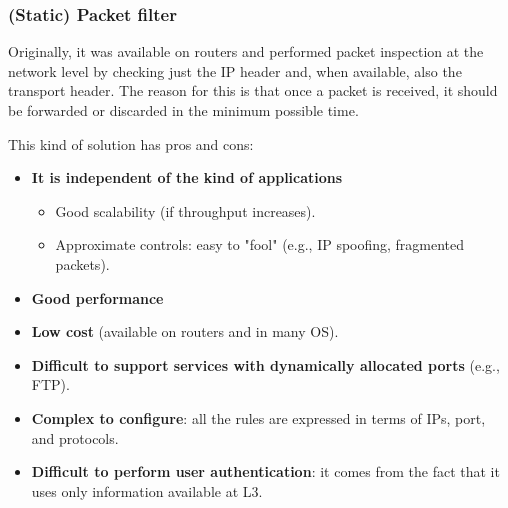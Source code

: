\subsubsection{(Static) Packet filter}
Originally, it was available on routers and performed packet inspection at the network level by checking just the IP header and, when available, also the transport header. The reason for this is that once a packet is received, it should be forwarded or discarded in the minimum possible time.

This kind of solution has pros and cons:

\begin{itemize}
    \item \textbf{It is independent of the kind of applications}
          \begin{itemize}
              \item Good scalability (if throughput increases).
              \item Approximate controls: easy to "fool" (e.g., IP spoofing, fragmented packets).
          \end{itemize}
    \item \textbf{Good performance}
    \item \textbf{Low cost} (available on routers and in many OS).
    \item \textbf{Difficult to support services with dynamically allocated ports} (e.g., FTP).
    \item \textbf{Complex to configure}: all the rules are expressed in terms of IPs, port, and protocols.
    \item \textbf{Difficult to perform user authentication}: it comes from the fact that it uses only information available at L3.
\end{itemize}



